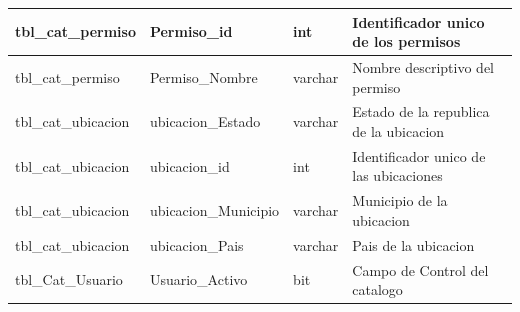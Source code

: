 \begin{longtable}[c]{|l|l|l|l|}
tbl\_cat\_permiso                                                                & Permiso\_id                                                                                    & int                                 & Identificador unico de los permisos                                                                                                               \\ \hline
tbl\_cat\_permiso                                                                & Permiso\_Nombre                                                                                & varchar                             & Nombre descriptivo del permiso                                                                                                                    \\ \hline
tbl\_cat\_ubicacion                                                              & ubicacion\_Estado                                                                              & varchar                             & Estado de la republica de la ubicacion                                                                                                            \\ \hline
tbl\_cat\_ubicacion                                                              & ubicacion\_id                                                                                  & int                                 & Identificador unico de las ubicaciones                                                                                                            \\ \hline
tbl\_cat\_ubicacion                                                              & ubicacion\_Municipio                                                                           & varchar                             & Municipio de la ubicacion                                                                                                                         \\ \hline
tbl\_cat\_ubicacion                                                              & ubicacion\_Pais                                                                                & varchar                             & Pais de la ubicacion                                                                                                                              \\ \hline
tbl\_Cat\_Usuario                                                                & Usuario\_Activo                                                                                & bit                                 & Campo de Control del catalogo                                                                                                                     \\ \hline

\end{longtable}

